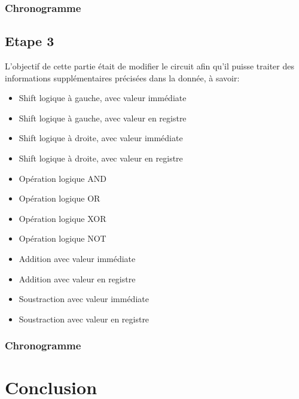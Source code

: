 \documentclass[a4paper]{article} %
\begin{document}
\subsubsection{Chronogramme}

\subsection{Etape 3}
L'objectif de cette partie était de modifier le circuit afin qu'il puisse traiter des informations supplémentaires précisées dans la donnée, à savoir:
\medskip
\begin{itemize}
    \item Shift logique à gauche, avec valeur immédiate
    \item Shift logique à gauche, avec valeur en registre
    \item Shift logique à droite, avec valeur immédiate
    \item Shift logique à droite, avec valeur en registre
    \item Opération logique AND
    \item Opération logique OR
    \item Opération logique XOR
    \item Opération logique NOT
    \item Addition avec valeur immédiate
    \item Addition avec valeur en registre
    \item Soustraction avec valeur immédiate
    \item Soustraction avec valeur en registre
\end{itemize}
\subsubsection{Chronogramme}
\section{Conclusion}
\end{document}
